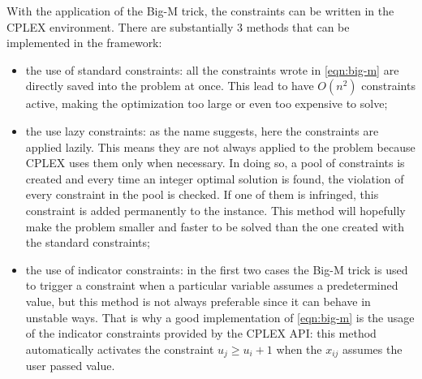 With the application of the Big-M trick, the constraints can be written in the CPLEX environment. There are substantially 3 methods that can be implemented in the framework:

\begin{itemize}
	\item the use of standard constraints: all the constraints wrote in \ref{eqn:big-m} are directly saved into the problem at once. This lead to have $O(n^2)$ constraints active, making the optimization too large or even too expensive to solve;
	
	\item the use lazy constraints: as the name suggests, here the constraints are applied lazily. This means they are not always applied to the problem because CPLEX uses them only when necessary. In doing so, a pool of constraints is created and every time an integer optimal solution is found, the violation of every constraint in the pool is checked.
	If one of them is infringed, this constraint is added permanently to the instance. This method will hopefully make the problem smaller and faster to be solved than the one created with the standard constraints;
	
	\item the use of indicator constraints: in the first two cases the Big-M trick is used to trigger a constraint when a particular variable assumes a predetermined value, but this method is not always preferable since it can behave in unstable ways. That is why a good implementation of \ref{eqn:big-m} is the usage of the indicator constraints provided by the CPLEX API: this method automatically activates the constraint $u_j \ge u_i + 1$ when the $x_{ij}$ assumes the user passed value.
\end{itemize}